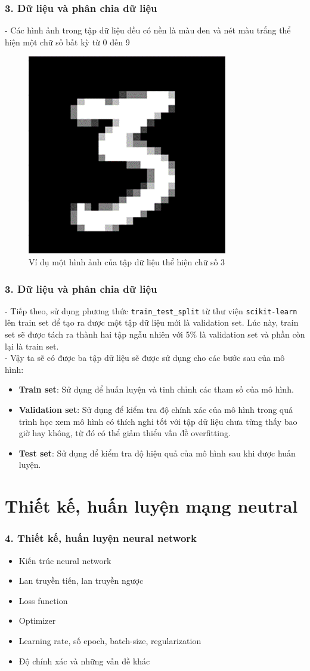 \documentclass{beamer}
\begin{document}
\begin{frame}
\frametitle{3. Dữ liệu và phân chia dữ liệu}
- Các hình ảnh trong tập dữ liệu đều có nền là màu đen và nét màu trắng thể hiện một chữ số bất kỳ từ 0 đến 9
\begin{figure}
    \centering
    \includegraphics[width=0.3\linewidth]{images/data_sample.png}
    \caption{Ví dụ một hình ảnh của tập dữ liệu thể hiện chữ số 3}
\end{figure}
\end{frame}

\begin{frame}
\frametitle{3. Dữ liệu và phân chia dữ liệu}
- Tiếp theo, sử dụng phương thức \texttt{train\_test\_split} từ thư viện \texttt{scikit-learn} lên train set để tạo ra được một tập dữ liệu mới là validation set. Lúc này, train set sẽ được tách ra thành hai tập ngẫu nhiên với 5\% là validation set và phần còn lại là train set.
\\- Vậy ta sẽ có được ba tập dữ liệu sẽ được sử dụng cho các bước sau của mô hình:
\begin{itemize}
    \item \textbf{Train set}:  Sử dụng để huấn luyện và tinh chỉnh các tham số của mô hình.
    \item \textbf{Validation set}: Sử dụng để kiểm tra độ chính xác của mô hình trong quá trình học xem mô hình có thích nghi tốt với tập dữ liệu chưa từng thấy bao giờ hay không, từ đó có thể giảm thiểu vấn đề overfitting.
    \item \textbf{Test set}: Sử dụng để kiểm tra độ hiệu quả của mô hình sau khi được huấn luyện.
\end{itemize}
\end{frame}


\section{Thiết kế, huấn luyện mạng neutral} 

\begin{frame}
\frametitle{4. Thiết kế, huấn luyện neural network}
\begin{itemize}
    \item Kiến trúc neural network
    \item Lan truyền tiến, lan truyền ngược
    \item Loss function
    \item Optimizer
    \item Learning rate, số epoch, batch-size, regularization
    \item Độ chính xác và những vấn đề khác
\end{itemize}
\end{frame}
\end{document}
